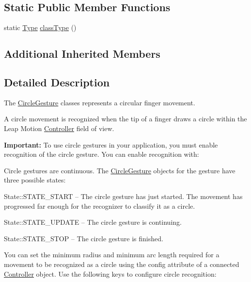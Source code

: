 \subsection*{Static Public Member Functions}
\begin{DoxyCompactItemize}
\item 
static \hyperlink{class_leap_1_1_gesture_a6fa6dd4f28c502f0d55abc6b71c6f9b1}{Type} \hyperlink{class_leap_1_1_circle_gesture_a8935a8a71b0a174a1656ff2caab80a06}{class\+Type} ()
\end{DoxyCompactItemize}
\subsection*{Additional Inherited Members}


\subsection{Detailed Description}
The \hyperlink{class_leap_1_1_circle_gesture}{Circle\+Gesture} classes represents a circular finger movement.

A circle movement is recognized when the tip of a finger draws a circle within the Leap Motion \hyperlink{class_leap_1_1_controller}{Controller} field of view.



{\bfseries Important\+:} To use circle gestures in your application, you must enable recognition of the circle gesture. You can enable recognition with\+:


\begin{DoxyCodeInclude}
\end{DoxyCodeInclude}


Circle gestures are continuous. The \hyperlink{class_leap_1_1_circle_gesture}{Circle\+Gesture} objects for the gesture have three possible states\+:


\begin{DoxyItemize}
\item State\+::\+S\+T\+A\+T\+E\+\_\+\+S\+T\+A\+R\+T -- The circle gesture has just started. The movement has progressed far enough for the recognizer to classify it as a circle.
\item State\+::\+S\+T\+A\+T\+E\+\_\+\+U\+P\+D\+A\+T\+E -- The circle gesture is continuing.
\item State\+::\+S\+T\+A\+T\+E\+\_\+\+S\+T\+O\+P -- The circle gesture is finished.
\end{DoxyItemize}

You can set the minimum radius and minimum arc length required for a movement to be recognized as a circle using the config attribute of a connected \hyperlink{class_leap_1_1_controller}{Controller} object. Use the following keys to configure circle recognition\+:

